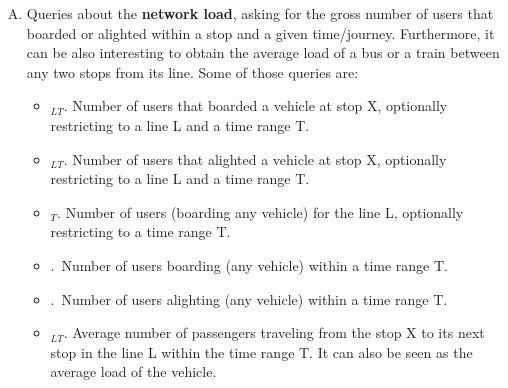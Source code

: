     \begin{enumerate}[A)]
        \item Queries about the \textbf{network load}, asking for the gross number of users that boarded or alighted within a stop and a given time/journey. Furthermore, it can be also interesting to obtain the average load of a bus or a train between any two stops from its line. Some of those queries are:
        \begin{itemize}
            \item \boardX$_{LT}$. Number of users that boarded a vehicle at stop X, optionally restricting to a line L and a time range T.
            \item \alightX$_{LT}$. Number of users that alighted a vehicle at stop X, optionally restricting to a line L and a time range T.
            \item \useL$_T$.  Number of users (boarding any vehicle) for the line L, optionally restricting to a time range T.
            \item \boardT.~Number of users boarding (any vehicle) within a time range T.
            \item \alightT.~Number of users alighting (any vehicle) within a time range T.
            \item \loadX$_{LT}$. Average number of passengers traveling from the stop X to its next stop in the line L within the time range T. It can also be seen as the average load of the vehicle.
        \end{itemize}
        

\end{enumerate}
